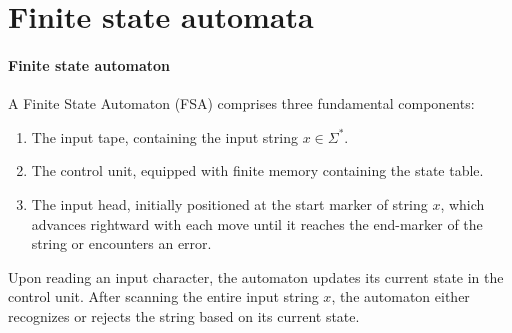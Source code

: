 \section{Finite state automata}

\paragraph*{Finite state automaton}
A Finite State Automaton (FSA) comprises three fundamental components:
\begin{enumerate}
    \item The input tape, containing the input string $x \in \Sigma^{\ast}$.
    \item The control unit, equipped with finite memory containing the state table.
    \item The input head, initially positioned at the start marker of string $x$, which advances rightward with each move until it reaches the end-marker of the string or encounters an error.
\end{enumerate}
Upon reading an input character, the automaton updates its current state in the control unit.
After scanning the entire input string $x$, the automaton either recognizes or rejects the string based on its current state.

